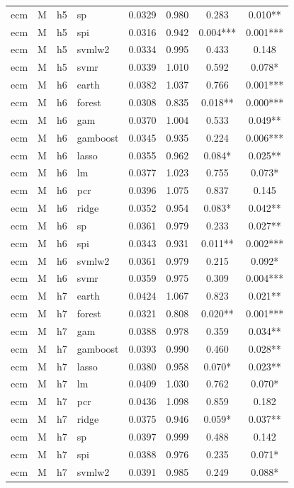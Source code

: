 \begin{ThreePartTable}
\begin{longtable}[t]{llclcccc}
ecm & M & h5 & sp & 0.0329 & 0.980 & 0.283 & 0.010**\\
ecm & M & h5 & spi & 0.0316 & 0.942 & 0.004*** & 0.001***\\
ecm & M & h5 & svmlw2 & 0.0334 & 0.995 & 0.433 & 0.148\\
ecm & M & h5 & svmr & 0.0339 & 1.010 & 0.592 & 0.078*\\
\addlinespace
ecm & M & h6 & earth & 0.0382 & 1.037 & 0.766 & 0.001***\\
ecm & M & h6 & forest & 0.0308 & 0.835 & 0.018** & 0.000***\\
ecm & M & h6 & gam & 0.0370 & 1.004 & 0.533 & 0.049**\\
ecm & M & h6 & gamboost & 0.0345 & 0.935 & 0.224 & 0.006***\\
ecm & M & h6 & lasso & 0.0355 & 0.962 & 0.084* & 0.025**\\
ecm & M & h6 & lm & 0.0377 & 1.023 & 0.755 & 0.073*\\
ecm & M & h6 & pcr & 0.0396 & 1.075 & 0.837 & 0.145\\
ecm & M & h6 & ridge & 0.0352 & 0.954 & 0.083* & 0.042**\\
ecm & M & h6 & sp & 0.0361 & 0.979 & 0.233 & 0.027**\\
ecm & M & h6 & spi & 0.0343 & 0.931 & 0.011** & 0.002***\\
ecm & M & h6 & svmlw2 & 0.0361 & 0.979 & 0.215 & 0.092*\\
ecm & M & h6 & svmr & 0.0359 & 0.975 & 0.309 & 0.004***\\
\addlinespace
ecm & M & h7 & earth & 0.0424 & 1.067 & 0.823 & 0.021**\\
ecm & M & h7 & forest & 0.0321 & 0.808 & 0.020** & 0.001***\\
ecm & M & h7 & gam & 0.0388 & 0.978 & 0.359 & 0.034**\\
ecm & M & h7 & gamboost & 0.0393 & 0.990 & 0.460 & 0.028**\\
ecm & M & h7 & lasso & 0.0380 & 0.958 & 0.070* & 0.023**\\
ecm & M & h7 & lm & 0.0409 & 1.030 & 0.762 & 0.070*\\
ecm & M & h7 & pcr & 0.0436 & 1.098 & 0.859 & 0.182\\
ecm & M & h7 & ridge & 0.0375 & 0.946 & 0.059* & 0.037**\\
ecm & M & h7 & sp & 0.0397 & 0.999 & 0.488 & 0.142\\
ecm & M & h7 & spi & 0.0388 & 0.976 & 0.235 & 0.071*\\
ecm & M & h7 & svmlw2 & 0.0391 & 0.985 & 0.249 & 0.088*\\

\end{longtable}
\end{ThreePartTable}

